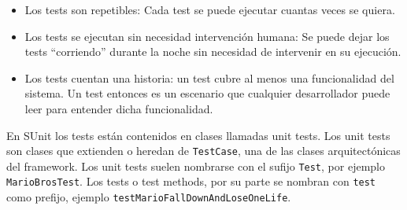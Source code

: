 \begin{itemize}
\item Los tests son repetibles: Cada test se puede ejecutar cuantas veces se quiera.
\item Los tests se ejecutan sin necesidad intervención humana: Se puede dejar los tests ``corriendo'' durante la noche sin necesidad de intervenir en su ejecución.
\item Los tests cuentan una historia: un test cubre al menos una funcionalidad del sistema. Un test entonces es un escenario que cualquier desarrollador puede leer para entender dicha funcionalidad.
\end{itemize}

\par En SUnit los tests están contenidos en clases llamadas unit tests. Los unit tests son clases que extienden o heredan de {\tt TestCase}, una de las clases arquitectónicas del framework. Los unit tests suelen nombrarse con el sufijo {\tt Test}, por ejemplo {\tt MarioBrosTest}. Los tests o test methods, por su parte se nombran con {\tt test} como prefijo, ejemplo {\tt testMarioFallDownAndLoseOneLife}.


